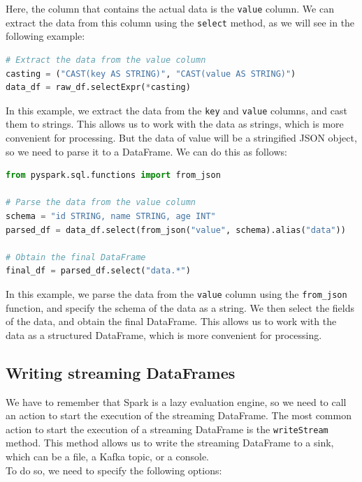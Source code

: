 Here, the column that contains the actual data is the \texttt{value} column. We can extract the data
from this column using the \texttt{select} method, as we will see in the following example:

\begin{lstlisting}[language=Python]
# Extract the data from the value column
casting = ("CAST(key AS STRING)", "CAST(value AS STRING)") 
data_df = raw_df.selectExpr(*casting)
\end{lstlisting}

In this example, we extract the data from the \texttt{key} and \texttt{value} columns, and cast them
to strings. This allows us to work with the data as strings, which is more convenient for processing. 
But the data of value will be a stringified JSON object, so we need to parse it to a DataFrame. 
We can do this as follows:

\begin{lstlisting}[language=Python]
from pyspark.sql.functions import from_json

# Parse the data from the value column
schema = "id STRING, name STRING, age INT"
parsed_df = data_df.select(from_json("value", schema).alias("data"))

# Obtain the final DataFrame
final_df = parsed_df.select("data.*")
\end{lstlisting}

In this example, we parse the data from the \texttt{value} column using the \texttt{from\_json} function,
and specify the schema of the data as a string. We then select the fields of the data, and obtain the
final DataFrame. This allows us to work with the data as a structured DataFrame, which is more convenient
for processing.

\subsection{Writing streaming DataFrames}

We have to remember that Spark is a lazy evaluation engine, so we need to call an action to start the
execution of the streaming DataFrame. The most common action to start the execution of a streaming
DataFrame is the \texttt{writeStream} method. This method allows us to write the streaming DataFrame
to a sink, which can be a file, a Kafka topic, or a console.\\

To do so, we need to specify the following options:

